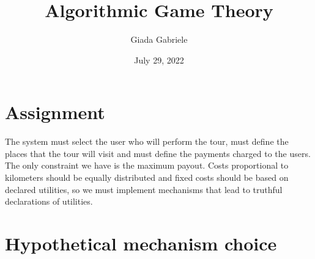 \documentclass{article}
\title{Algorithmic Game Theory}
\author{Giada Gabriele}
\date{July 29, 2022}
\begin{document}
\maketitle
\section{Assignment}
\Large{
The system must select the user who will perform the tour, must define the places that the tour will visit and must define the payments charged to the users. The only constraint we have is the maximum payout. Costs proportional to kilometers should be equally distributed and fixed costs should be based on declared utilities, so we must implement mechanisms that lead to truthful declarations of utilities.
}
\section{Hypothetical mechanism choice}
\end{document}
